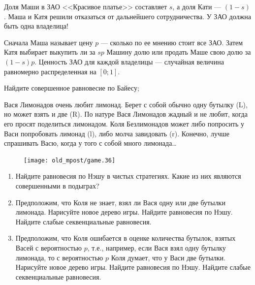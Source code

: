 \begin{problem}
Доля Маши в ЗАО <<Красивое платье>> составляет  $s$, а доля Кати ---  $\left(1-s\right)$. Маша и Катя решили отказаться от дальнейшего сотрудничества. У ЗАО должна быть одна владелица!\par
Сначала Маша называет цену  $p$  --- сколько по ее мнению стоит все ЗАО. Затем Катя выбирает выкупить ли за  $sp$  Машину долю или продать Маше свою долю за  $\left(1-s\right)p$.
Ценность ЗАО для каждой владелицы --- случайная величина равномерно распределенная на  $\left[0;1\right]$.\par
Найдите совершенное равновесие по Байесу;\par



\begin{sol}

\end{sol}
\end{problem}





\begin{problem}
Вася Лимонадов очень любит лимонад. Берет с собой обычно одну бутылку (L), но может взять и две (R). По натуре Вася Лимонадов жадный и не любит, когда его просят поделиться лимонадом. Коля Безлимонадов может либо попросить у Васи попробовать лимонад (l), либо молча завидовать (r). Конечно, лучше спрашивать Васю, когда у того с собой много лимонада\ldots \par
\begin{figure}[htbp]
     \texttt{[image: old\_mpost/game.36]}
\end{figure}

\begin{enumerate}
\item Найдите равновесия по Нэшу в чистых стратегиях. Какие из них являются совершенными в подыграх?\par
\item Предположим, что Коля не знает, взял ли Вася одну или две бутылки лимонада. Нарисуйте новое дерево игры. Найдите равновесия по Нэшу. Найдите слабые секвенциальные равновесия.\par
\item  Предположим, что Коля ошибается в оценке количества бутылок, взятых Васей с вероятностью  $p$, т.е., например, если Вася взял одну бутылку лимонада, то с вероятностью  $p$  Коля думает, что у Васи две бутылки. Нарисуйте новое дерево игры. Найдите равновесия по Нэшу. Найдите слабые секвенциальные равновесия.\par
\end{enumerate}


\begin{sol}

\end{sol}
\end{problem}




